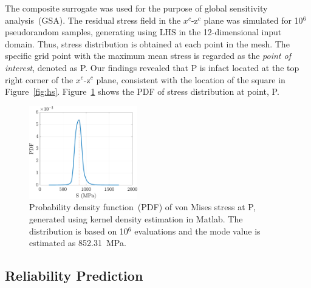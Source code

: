 The composite surrogate was used for the purpose of global sensitivity analysis~(GSA). The residual stress
field in the $x^c$-z$^c$ plane was simulated for 10$^6$ pseudorandom samples, generating using LHS
in the 12-dimensional input domain. Thus, stress distribution is obtained at each point in the mesh. 
The specific grid point with the maximum mean stress is regarded as the \textit{point of interest},
denoted as P. Our findings revealed that P is infact located at the top right corner of the $x^c$-z$^c$
plane, consistent with the location of the square in Figure~\ref{fig:hs}.
Figure~\ref{fig:kde_S} shows the PDF of stress distribution at point, P. 
%
\begin{figure}[htbp]
\begin{center}
\includegraphics[width=0.42\textwidth]{./Figures/kde_S_mumax}
\end{center}
\caption{Probability density function~(PDF) of von Mises stress at P, generated using kernel density estimation in 
Matlab. The distribution is based on 10$^6$ evaluations and the mode value is estimated as 852.31~MPa.}
\label{fig:kde_S}
\end{figure}
%

\subsection{Reliability Prediction}
\label{sub:reliability}




 
